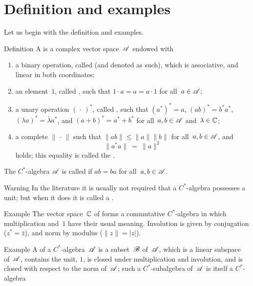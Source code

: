 \documentclass[a]{subfiles}
\begin{document}
\section{Definition and examples}
Let us begin with the definition
and examples.
\begin{parsec}%
\begin{point}{Definition}%
A 
is a complex vector space~$\mathscr{A}$
endowed with
\begin{enumerate}
\item
a binary operation,
called 
(and denoted as such),
which is associative, and linear in both coordinates;
\item
an element~$1$, called ,
such that $1\cdot a = a = a\cdot 1$
for all~$a\in \mathscr{A}$;
\item
a unary operation $(\,\cdot\,)^*$,
called ,
such that $(a^*)^*=a$,
$(ab)^*=b^*a^*$,
$(\lambda a)^* = \bar\lambda a^*$,
and $(a+b)^* = a^*+b^*$
for all~$a,b\in\mathscr{A}$ and~$\lambda\in \mathbb{C}$;
\item
a complete  $\|\,\cdot\,\|$
such that
$\|ab\|\leq\|a\|\|b\|$
for all~$a,b\in\mathscr{A}$,
and 
\begin{equation*}
\label{eq:Cstar-identity}
\|a^*a\|\ =\ \|a\|^2
\end{equation*}
holds; this equality is called the .
\end{enumerate}
The $C^*$-algebra $\mathscr{A}$ is called 
if $ab=ba$ for all~$a,b\in\mathscr{A}$.
\begin{point}{Warning}%
In the literature it is usually not
required that a $C^*$-algebra
possesses a unit; but when it does it is called
a .
\end{point}
\end{point}
\begin{point}{Example}%
The vector space~$\mathbb{C}$ of 
forms a commutative  $C^*$-algebra
in which
multiplication and~$1$
have their usual meaning.
Involution is given by conjugation ($z^*=\bar{z}$),
and norm by modulus ($\|z\|=|z|$).
\end{point}
\begin{point}{Example}%
A 
of a $C^*$-algebra~$\mathscr{A}$
is a subset~$\mathscr{B}$ of~$\mathscr{A}$,
which is a linear subspace of~$\mathscr{A}$,
contains the unit, $1$, is closed under multiplication
and involution, 
and is closed with respect to the norm of~$\mathscr{A}$;
such a $C^*$-subalgebra of~$\mathscr{A}$
is itself a $C^*$-algebra

\end{point}
\end{parsec}
\end{document}
